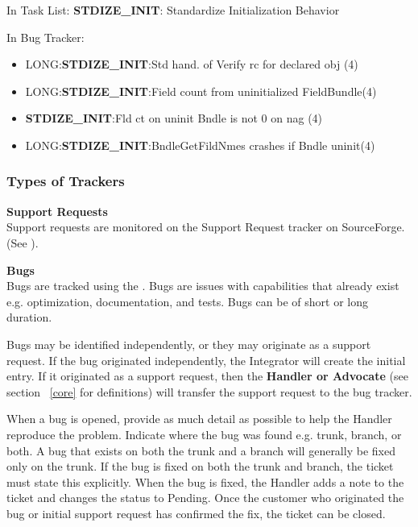 \vspace{2mm}
In Task List: {\bf STDIZE\_INIT}: Standardize Initialization Behavior

\vspace{2mm}
In Bug Tracker:
\begin{itemize}
\item LONG:{\bf STDIZE\_INIT}:Std hand. of Verify rc for declared obj (4)
\item LONG:{\bf STDIZE\_INIT}:Field count from uninitialized FieldBundle(4)
\item {\bf STDIZE\_INIT}:Fld ct on uninit Bndle is not 0 on nag (4)
\item LONG:{\bf STDIZE\_INIT}:BndleGetFildNmes crashes if Bndle uninit(4)
\end{itemize}

\subsubsection{Types of Trackers}
\label{sec:trackertypes}
{\bf Support Requests}\\

Support requests are monitored on the Support Request tracker on SourceForge. 
(See ). 

{\bf Bugs}\\

Bugs are tracked using the . Bugs are issues with capabilities that already exist e.g. optimization, documentation, and tests. Bugs can be of short or long duration.  

Bugs may be identified independently, or they may originate as a support request. If the bug originated independently, the Integrator will create the initial entry. If it originated as a support request, then the {\bf Handler or Advocate} (see section ~\ref{core} for definitions) will transfer the support request to the bug tracker. 

When a bug is opened, provide as much detail as possible to help the Handler reproduce the problem. Indicate where the bug was found e.g. trunk, branch, or both. A bug that exists on both the trunk and a branch will generally be fixed only on the trunk. If the bug is fixed on both the trunk and branch, the ticket must  state this explicitly. When the bug is fixed, the Handler adds a note to the ticket and changes the status to Pending. Once the customer who originated the bug or initial support request has confirmed the fix, the ticket can be closed.\\ 

